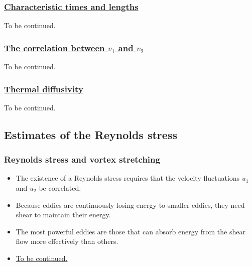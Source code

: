 \documentclass[review]{elsarticle}
\begin{document}
	\subsubsection{\underline{Characteristic times and lengths}}
		To be continued.
	\subsubsection{\underline{The correlation between $v_1$ and $v_2$}}
		To be continued.
	\subsubsection{\underline{Thermal diffusivity}}
		To be continued.
	
	\subsection{Estimates of the Reynolds stress}
	\subsubsection{Reynolds stress and vortex stretching}
		\begin{itemize}
			\item The existence of a Reynolds stress requires that the velocity fluctuations $u_1$ and $u_2$ be correlated.
			\item Because eddies are continuously losing energy to smaller eddies, they need shear to maintain their energy.
			\item The most powerful eddies are those that can absorb energy from the shear flow more effectively than others.
			\item \underline{To be continued.}
		\end{itemize}
\end{document}
